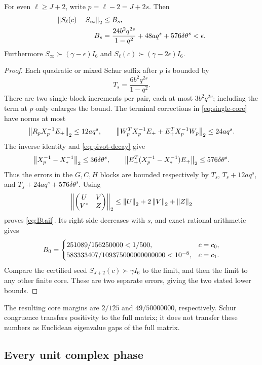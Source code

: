 \begin{proposition}\label{prop:tail}
For even $\ell\ge J+2$, write $p=\ell-2=J+2s$. Then
\begin{align}
 \left\lVert S_\ell(c)-S_\infty\right\rVert_2
 &\le B_s,\notag\\
 B_s&=\frac{24b^2q^{2s}}{1-q^2}+48aq^s+576\delta\theta^s
      <\epsilon.\label{eq:Btail}
\end{align}
Furthermore $S_\infty\succ(\gamma-\epsilon)I_6$ and
$S_\ell(c)\succ(\gamma-2\epsilon)I_6$.
\end{proposition}
\begin{proof}
Each quadratic or mixed Schur suffix after $p$ is bounded by
\[
 T_s=\frac{6b^2q^{2s}}{1-q^2}.
\]
There are two single-block increments per pair, each at most
$3b^2q^{2v}$; including the term at $p$ only enlarges the bound.
The terminal corrections in \eqref{eq:single-core} have norms at most
\[
 \left\lVert R_pX_p^{-1}E_+\right\rVert_2\le12a q^s,
 \qquad
 \left\lVert W_p^TX_p^{-1}E_++E_+^TX_p^{-1}W_p\right\rVert_2\le24a q^s.
\]
The inverse identity and \eqref{eq:pivot-decay} give
\[
 \left\lVert X_p^{-1}-X_*^{-1}\right\rVert_2\le36\delta\theta^s,
 \qquad
 \left\lVert E_+^T(X_p^{-1}-X_*^{-1})E_+\right\rVert_2\le576\delta\theta^s.
\]
Thus the errors in the $G,C,H$ blocks are bounded respectively by
$T_s$, $T_s+12aq^s$, and $T_s+24aq^s+576\delta\theta^s$.
Using
\[
 \left\lVert\begin{pmatrix}U&V\\V^*&Z\end{pmatrix}\right\rVert_2
 \le\left\lVert U\right\rVert_2+2\left\lVert V\right\rVert_2+\left\lVert Z\right\rVert_2
\]
proves \eqref{eq:Btail}. Its right side decreases with $s$, and exact
rational arithmetic gives
\begin{equation}
 B_0=
 \begin{cases}
 251089/156250000<1/500,&c=c_0,\\
 583333407/109375000000000000<10^{-8},&c=c_1.
 \end{cases}
 \label{eq:B0}
\end{equation}
Compare the certified seed $S_{J+2}(c)\succ\gamma I_6$ to the limit,
and then the limit to any other finite core. These are two separate
errors, giving the two stated lower bounds.
\end{proof}

The resulting core margins are $2/125$ and $49/50000000$, respectively.
Schur congruence transfers positivity to the full matrix; it does not
transfer these numbers as Euclidean eigenvalue gaps of the full matrix.

\subsection{Every unit complex phase}
\label{sec:phase}

